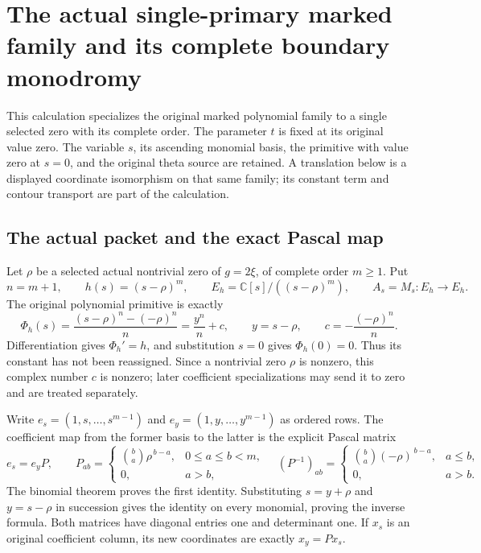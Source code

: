 \section{The actual single-primary marked family and its complete boundary monodromy}
\label{CFStage:sec:sp-primary}

This calculation specializes the original marked polynomial family to a
single selected zero with its complete order. The parameter \(t\) is
fixed at its original value zero. The variable \(s\), its ascending
monomial basis, the primitive with value zero at \(s=0\), and the
original theta source are retained. A translation below is a displayed
coordinate isomorphism on that same family; its constant term and
contour transport are part of the calculation.

\subsection{The actual packet and the exact Pascal map}

Let \(\rho\) be a selected actual nontrivial zero of \(g=2\xi\), of
complete order \(m\ge1\). Put
\[
 n=m+1,\qquad h(s)=(s-\rho)^m,\qquad
 E_h=\mathbb C[s]/((s-\rho)^m),\qquad
 A_s=M_s:E_h\to E_h.
 \tag{SP.1}\label{CFStage:eq:sp-packet}
\]
The original polynomial primitive is exactly
\[
 \Phi_h(s)=\frac{(s-\rho)^n-(-\rho)^n}{n}
       =\frac{y^n}{n}+c,\qquad
 y=s-\rho,\qquad c=-\frac{(-\rho)^n}{n}.
 \tag{SP.2}\label{CFStage:eq:sp-phase}
\]
Differentiation gives \(\Phi_h'=h\), and substitution \(s=0\)
gives \(\Phi_h(0)=0\). Thus its constant has not been reassigned.
Since a nontrivial zero \(\rho\) is nonzero, this complex number
\(c\) is nonzero; later coefficient specializations may send it
to zero and are treated separately.

Write \(e_s=(1,s,\ldots,s^{m-1})\) and
\(e_y=(1,y,\ldots,y^{m-1})\) as ordered rows. The coefficient map
from the former basis to the latter is the explicit Pascal matrix
\[
 e_s=e_yP,\qquad
 P_{ab}=
 \begin{cases}\binom ba\rho^{\,b-a},&0\le a\le b<m,\\0,&a>b,\end{cases}
 \quad
 (P^{-1})_{ab}=
 \begin{cases}\binom ba(-\rho)^{\,b-a},&a\le b,\\0,&a>b.\end{cases}
 \tag{SP.3}\label{CFStage:eq:sp-pascal}
\]
The binomial theorem proves the first identity. Substituting
\(s=y+\rho\) and \(y=s-\rho\) in succession gives the identity on
every monomial, proving the inverse formula. Both matrices have
diagonal entries one and determinant one. If \(x_s\) is an original
coefficient column, its new coordinates are exactly \(x_y=Px_s\).

